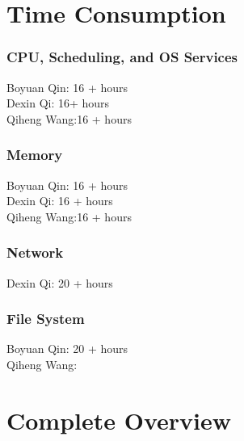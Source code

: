 \documentclass{article} %
\begin{document}
\section{Time Consumption}
\subsubsection{CPU, Scheduling, and OS Services}
Boyuan Qin: 16 + hours\\
Dexin Qi: 16+ hours\\
Qiheng Wang:16 + hours
\subsubsection{Memory}
Boyuan Qin: 16 + hours\\
Dexin Qi: 16 + hours\\
Qiheng Wang:16 + hours
\subsubsection{Network}
Dexin Qi: 20 + hours 
\subsubsection{File System}
Boyuan Qin: 20 + hours\\
Qiheng Wang: 


\section{Complete Overview}
\end{document}
